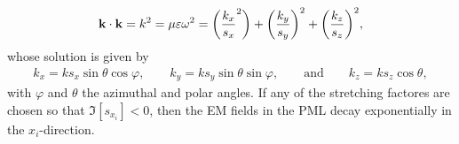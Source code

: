    \begin{align}
        \vb{k} \cdot \vb{k}  = k^2 = \mu\varepsilon\omega^2 =
            \qty(\frac{k_x}{s_x}^2 )+ \qty(\frac{k_y}{s_y})^2 + \qty(\frac{k_z}{s_z})^2,
     \label{eq:k-reldisp}
    \end{align}
    whose solution is given by \cite{jin_theory_2010,chew_complex_1997}
    \begin{align}
        k_x = k s_x \sin\theta\cos\varphi, \qquad
            k_y = k s_y \sin\theta\sin\varphi, \qquad \text{and}\qquad
                k_z = k s_z \cos\theta,
     \label{eq:kstretchcomp}
    \end{align}
    with $\varphi$ and $\theta$ the azimuthal and polar angles. If any of the stretching factores are chosen so that $\Im[s_{x_i}]<0$, then the EM fields in the PML decay exponentially in the $x_i$-direction.

